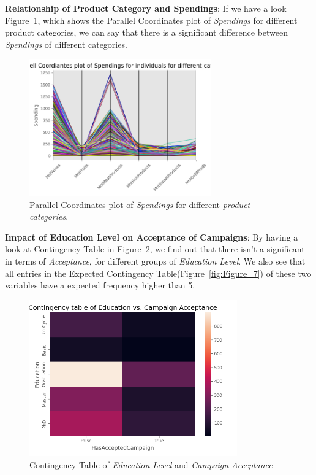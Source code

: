 \documentclass[a4paper,12pt]{article}
\begin{document}
\noindent \textbf{Relationship of Product Category and Spendings}: If we have a look Figure~\ref{fig:Figure_5}, which shows the Parallel Coordinates plot of \textit{Spendings} for different product categories, 
we can say that there is a significant difference between \textit{Spendings} of different categories.

\begin{figure}[H]
    \centering
    \includegraphics[width=0.7\textwidth]{./images/parallel_coor_spending_indivi_category.png}
    \caption{Parallel Coordinates plot of \textit{Spendings} for different \textit{product categories}.}
    \label{fig:Figure_5}
\end{figure}


\noindent \textbf{Impact of Education Level on Acceptance of Campaigns}: By having a look at Contingency Table in Figure~\ref{fig:Figure_6}, we find out that there isn't a significant in terms of \textit{Acceptance}, 
for different groups of \textit{Education Level}. We also see that all entries in the Expected Contingency Table(Figure~\ref{fig:Figure_7}) of these two variables have a expected frequency higher than 5.

\begin{figure}[H]
    \centering
    \includegraphics[width=0.8\textwidth]{./images/contingency_edu_vs_campaign_acceptance.png}
    \caption{Contingency Table of \textit{Education Level} and \textit{Campaign Acceptance}}
    \label{fig:Figure_6}
\end{figure}
\end{document}
